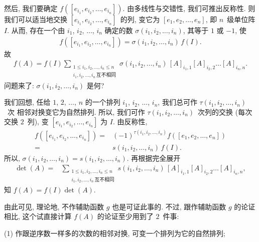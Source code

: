 \documentclass[../libro.tex]{subfiles}
\begin{document}
然后, 我们要确定
\(f([e_{i_1}, e_{i_2}, \dots, e_{i_n}])\).
由多线性与交错性, 我们可推出反称性.
则我们可以适当地交换
\([e_{i_1}, e_{i_2}, \dots, e_{i_n}]\)~的列,
变它为 \([e_1, e_2, \dots, e_n]\),
即 \(n\)~级单位阵 \(I\).
从而, 存在一个由 \(i_1\), \(i_2\), \(\dots\), \(i_n\)
确定的数 \(\sigma (i_1, i_2, \dots, i_n)\),
其等于 \(1\) 或 \(-1\),
使
\begin{align*}
    f([e_{i_1}, e_{i_2}, \dots, e_{i_n}])
    = \sigma (i_1, i_2, \dots, i_n)\, f(I).
\end{align*}
故
\begin{align*}
    f(A)
    = f(I) \sum_{\substack{
            1 \leq i_1, i_2, \dots, i_n \leq n \\
            i_1, i_2, \dots, i_n\,\text{互不相同}
    }}
    {\sigma (i_1, i_2, \dots, i_n)\,
    [A]_{i_1,1} [A]_{i_2,2} \dots [A]_{i_n,n}}.
\end{align*}
问题来了:
\(\sigma (i_1, i_2, \dots, i_n)\) 是何?

我们回想,
任给 \(1\), \(2\), \(\dots\), \(n\)
的一个排列 \(i_1\), \(i_2\), \(\dots\), \(i_n\),
我们总可作 \(\tau (i_1, i_2, \dots, i_n)\)~次%
相邻对换变它为自然排列.
所以, 我们可作
\(\tau (i_1, i_2, \dots, i_n)\)~次列的交换
(每次交换 \(2\)~列),
变 \([e_{i_1}, e_{i_2}, \dots, e_{i_n}]\) 为 \(I\).
由反称性,
\begin{align*}
    f([e_{i_1}, e_{i_2}, \dots, e_{i_n}])
    = {} &
    (-1)^{\tau (i_1, i_2, \dots, i_n)}
    f([e_1, e_2, \dots, e_n])
    \\
    = {} &
    s(i_1, i_2, \dots, i_n)\, f(I).
\end{align*}
所以,
\(\sigma (i_1, i_2, \dots, i_n)
= s(i_1, i_2, \dots, i_n)\).
再根据完全展开
\begin{align*}
    \det {(A)}
    = {} & \sum_{\substack{
            1 \leq i_1, i_2, \dots, i_n \leq n \\
            i_1, i_2, \dots, i_n\,\text{互不相同}
    }}
    {s(i_1, i_2, \dots, i_n)\,
    [A]_{i_1,1} [A]_{i_2,2} \dots [A]_{i_n,n}},
\end{align*}
知 \(f(A) = f(I) \det {(A)}\).

由此可见, 理论地, 不作辅助函数 \(g\) 也是可证此事的.
不过, 跟作辅助函数 \(g\) 的论证相比,
这个试直接计算 \(f(A)\) 的论证至少用到了 \(2\)~件事:

(1)
作跟逆序数一样多的次数的相邻对换,
可变一个排列为它的自然排列;
\end{document}
